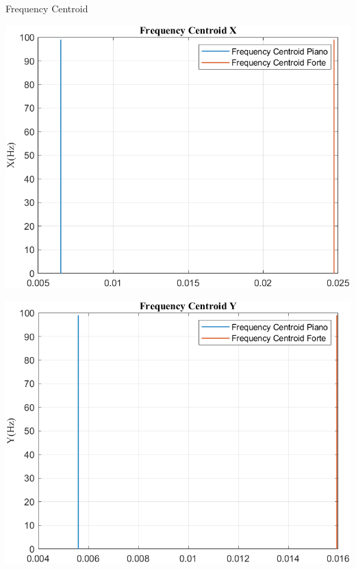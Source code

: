 	\begin{frame}{{Frequency Centroid}}
		\begin{minipage}{.45\textwidth}
			\centering\includegraphics[width=.9\textwidth]{figure/Vel/Trasformata/Frequency CentroidX}
		\end{minipage}
		\hspace{.05\textwidth}
		\begin{minipage}{.45\textwidth}
			\centering\includegraphics[width=.9\textwidth]{figure/Vel/Trasformata/Frequency CentroidY}
		\end{minipage}
	\end{frame}
	
